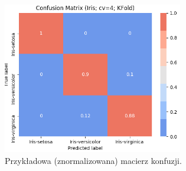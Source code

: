    \begin{figure}[H]
        \center
        \includegraphics[width=0.7\textwidth]{img/sample_conf_matrix.png}
        \caption{Przykładowa (znormalizowana) macierz konfuzji.}
    \end{figure}